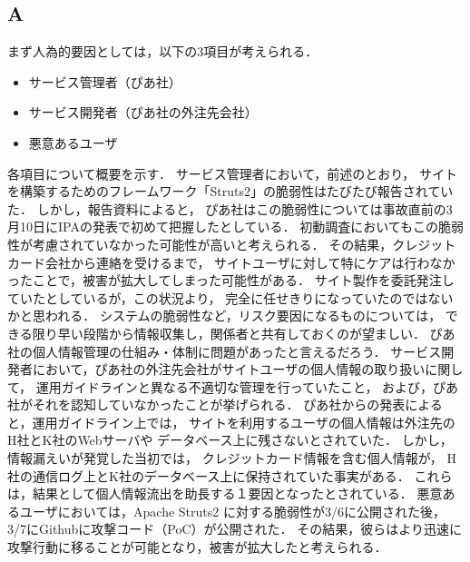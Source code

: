 \documentclass[uplatex]{jsarticle}
\begin{document}
\subsection*{A}
まず人為的要因としては，以下の3項目が考えられる．
\begin{itemize}
    \item サービス管理者（ぴあ社）
    \item サービス開発者（ぴあ社の外注先会社）
    \item 悪意あるユーザ
\end{itemize}
各項目について概要を示す．
サービス管理者において，前述のとおり，
サイトを構築するためのフレームワーク「Struts2」の脆弱性はたびたび報告されていた．
しかし，報告資料によると，
ぴあ社はこの脆弱性については事故直前の3月10日にIPAの発表で初めて把握したとしている．
初動調査においてもこの脆弱性が考慮されていなかった可能性が高いと考えられる．
その結果，クレジットカード会社から連絡を受けるまで，
サイトユーザに対して特にケアは行わなかったことで，被害が拡大してしまった可能性がある．
サイト製作を委託発注していたとしているが，この状況より，
完全に任せきりになっていたのではないかと思われる．
システムの脆弱性など，リスク要因になるものについては，
できる限り早い段階から情報収集し，関係者と共有しておくのが望ましい．
ぴあ社の個人情報管理の仕組み・体制に問題があったと言えるだろう．
サービス開発者において，ぴあ社の外注先会社がサイトユーザの個人情報の取り扱いに関して，
運用ガイドラインと異なる不適切な管理を行っていたこと，
および，ぴあ社がそれを認知していなかったことが挙げられる．
ぴあ社からの発表によると，運用ガイドライン上では，
サイトを利用するユーザの個人情報は外注先のH社とK社のWebサーバや
データベース上に残さないとされていた．
しかし，情報漏えいが発覚した当初では，
クレジットカード情報を含む個人情報が，
H社の通信ログ上とK社のデータベース上に保持されていた事実がある．
これらは，結果として個人情報流出を助長する１要因となったとされている．
悪意あるユーザにおいては，Apache Struts2 に対する脆弱性が3/6に公開された後，
3/7にGithubに攻撃コード（PoC）が公開された．
その結果，彼らはより迅速に攻撃行動に移ることが可能となり，被害が拡大したと考えられる．
\end{document}

